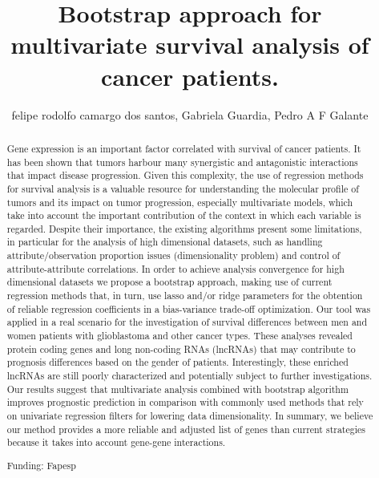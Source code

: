 \documentclass[twoside]{article}
\title{\vspace{-15mm}\fontsize{24pt}{10pt}\selectfont\textbf{ Bootstrap approach for multivariate survival analysis of  cancer patients. }} %
\author{ felipe rodolfo camargo dos santos, Gabriela Guardia, Pedro A F Galante }
\affil{ Instituto de Ensino e Pesquisa - Hospital S\'{\i}rio Liban\^es }
\date{}
\begin{document}
  
  
  \maketitle %
  
  
  \thispagestyle{fancy} %
  
  
  \begin{abstract}
  Gene expression is an important factor correlated with survival of cancer patients. It has been shown that tumors harbour many synergistic and antagonistic interactions that impact disease progression. Given this complexity,  the use of regression methods for survival analysis is a valuable resource for understanding the molecular profile of tumors and its impact on tumor progression,  especially multivariate models,  which take into account the important contribution of the context in which each variable is regarded. Despite their importance,  the existing algorithms present some limitations,  in particular for the analysis of high dimensional datasets,  such as handling attribute/observation proportion issues (dimensionality problem) and control of attribute-attribute correlations. In order to achieve analysis convergence for high dimensional datasets we propose a bootstrap approach,  making use of current regression methods that,  in turn,  use lasso and/or ridge parameters for the obtention of reliable regression coefficients in a bias-variance trade-off optimization. Our tool was applied in a real scenario for the  investigation of  survival differences between men and women patients with glioblastoma and other cancer types. These analyses revealed protein coding genes and long non-coding RNAs (lncRNAs) that may contribute to prognosis differences based on the gender of patients. Interestingly,  these enriched lncRNAs are still poorly characterized and potentially subject to further investigations. Our results  suggest that multivariate analysis combined with bootstrap algorithm improves prognostic prediction in comparison with commonly used methods that rely on univariate regression filters for lowering data dimensionality. In summary,  we believe our method provides a more reliable and adjusted list of genes than current strategies because it takes into account gene-gene interactions.
  
  Funding: Fapesp \\ 
  \end{abstract}
  
\end{document}
